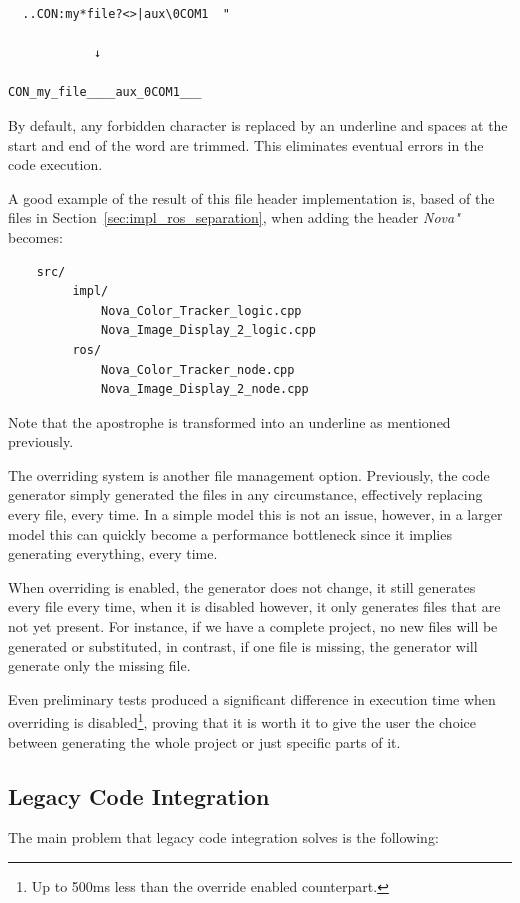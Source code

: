 \begin{verbatim}
  ..CON:my*file?<>|aux\0COM1  "

			↓

CON_my_file____aux_0COM1___
\end{verbatim}

By default, any forbidden character is replaced by an underline and spaces at the start and end of the word are trimmed. This eliminates eventual errors in the code execution.

A good example of the result of this file header implementation is, based of the files in Section~\ref{sec:impl_ros_separation}, when adding the header \textit{Nova"} becomes:

\begin{verbatim}
	src/
		 impl/
			 Nova_Color_Tracker_logic.cpp
			 Nova_Image_Display_2_logic.cpp
		 ros/
			 Nova_Color_Tracker_node.cpp
			 Nova_Image_Display_2_node.cpp
\end{verbatim}

Note that the apostrophe is transformed into an underline as mentioned previously.

The overriding system is another file management option. Previously, the code generator simply generated the files in any circumstance, effectively replacing every file, every time. In a simple model this is not an issue, however, in a larger model this can quickly become a performance bottleneck since it implies generating everything, every time. 

When overriding is enabled, the generator does not change, it still generates every file every time, when it is disabled however, it only generates files that are not yet present. For instance, if we have a complete project, no new files will be generated or substituted, in contrast, if one file is missing, the generator will generate only the missing file.

Even preliminary tests produced a significant difference in execution time when overriding is disabled\footnote{Up to 500ms less than the override enabled counterpart.}, proving that it is worth it to give the user the choice between generating the whole project or just specific parts of it.

\subsection{Legacy Code Integration}
\label{sec:impl_legacy_code}

The main problem that legacy code integration solves is the following:

